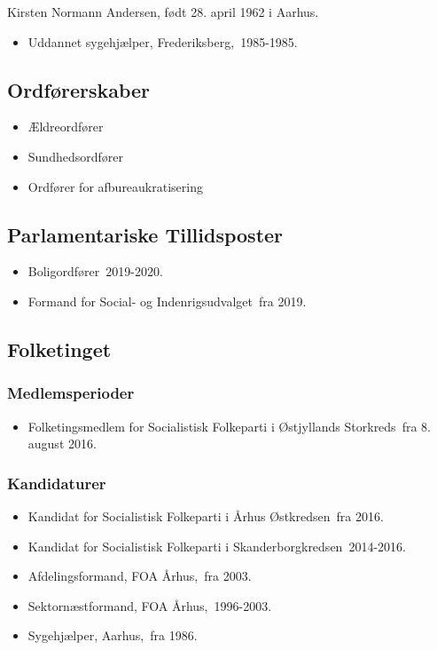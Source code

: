 \documentclass[11pt, a4paper]{awesome-cv}
\begin{document}
\makecvheader[R]
\makelettertitle
\begin{cvletter}
Kirsten Normann Andersen, født 28. april 1962 i Aarhus.

\begin{itemize}
\item Uddannet sygehjælper, Frederiksberg, 1985-1985.
\end{itemize}
\subsection*{Ordførerskaber}
\begin{itemize}
\item Ældreordfører
\item Sundhedsordfører
\item Ordfører for afbureaukratisering
\end{itemize}
\subsection*{Parlamentariske Tillidsposter}
\begin{itemize}
\item Boligordfører 2019-2020.
\item Formand for Social- og Indenrigsudvalget fra 2019.
\end{itemize}
\subsection*{Folketinget}
\subsubsection*{Medlemsperioder}
\begin{itemize}
\item Folketingsmedlem for Socialistisk Folkeparti i Østjyllands Storkreds fra 8. august 2016.
\end{itemize}
\subsubsection*{Kandidaturer}
\begin{itemize}
\item Kandidat for Socialistisk Folkeparti i Århus Østkredsen fra 2016.
\item Kandidat for Socialistisk Folkeparti i Skanderborgkredsen 2014-2016.
\end{itemize}
\begin{itemize}
\item Afdelingsformand, FOA Århus, fra 2003.
\item Sektornæstformand, FOA Århus, 1996-2003.
\item Sygehjælper, Aarhus, fra 1986.
\end{itemize}
\end{cvletter}
\end{document}
